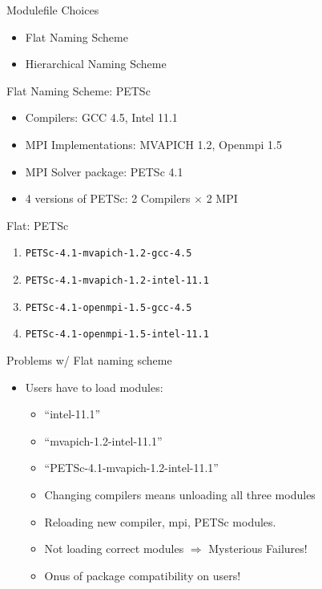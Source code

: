 \documentclass{beamer}
\begin{document}
\begin{frame}{Modulefile Choices}
  \begin{itemize}
    \item Flat Naming Scheme
    \item Hierarchical Naming Scheme
  \end{itemize}
\end{frame}

\begin{frame}{Flat Naming Scheme: PETSc}
  \begin{itemize}
    \item Compilers: GCC 4.5, Intel 11.1
    \item MPI Implementations: MVAPICH 1.2, Openmpi 1.5
    \item MPI Solver package: PETSc 4.1
    \item 4 versions of PETSc: 2 Compilers $\times$ 2 MPI 
  \end{itemize}
\end{frame}

\begin{frame}{Flat: PETSc }
  \begin{enumerate}
  \item \texttt{PETSc-4.1-mvapich-1.2-gcc-4.5}
  \item \texttt{PETSc-4.1-mvapich-1.2-intel-11.1}
  \item \texttt{PETSc-4.1-openmpi-1.5-gcc-4.5}
  \item \texttt{PETSc-4.1-openmpi-1.5-intel-11.1}
  \end{enumerate}
\end{frame}

\begin{frame}{Problems w/ Flat naming scheme}
  \begin{itemize}
    \item Users have to load modules:
      \begin{itemize}
        \item ``intel-11.1''
        \item ``mvapich-1.2-intel-11.1''
        \item ``PETSc-4.1-mvapich-1.2-intel-11.1''
        \item Changing compilers means unloading all three modules
        \item Reloading new compiler, mpi, PETSc modules.
        \item Not loading correct modules $\Rightarrow$ Mysterious Failures!
        \item Onus of package compatibility on users! 
      \end{itemize}
  \end{itemize}
\end{frame}
\end{document}
